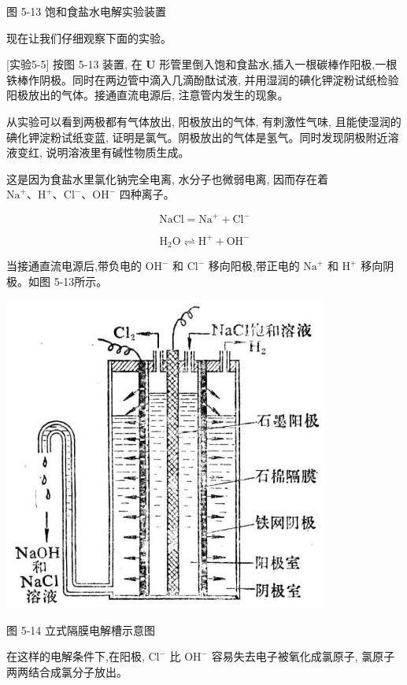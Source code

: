 \documentclass[10pt]{article}
\begin{document}
图 5-13 饱和食盐水电解实验装置

现在让我们仔细观察下面的实验。

[实验5-5] 按图 5-13 装置, 在 \(\mathbf{U}\) 形管里倒入饱和食盐水,插入一根碳棒作阳极,一根铁棒作阴极。同时在两边管中滴入几滴酚酞试液, 并用湿润的碘化钾淀粉试纸检验阳极放出的气体。接通直流电源后, 注意管内发生的现象。

从实验可以看到两极都有气体放出, 阳极放出的气体, 有刺激性气味, 且能使湿润的碘化钾淀粉试纸变蓝, 证明是氯气。阴极放出的气体是氢气。同时发现阴极附近溶液变红, 说明溶液里有碱性物质生成。

这是因为食盐水里氯化钠完全电离, 水分子也微弱电离, 因而存在着 \({\mathrm{{Na}}}^{ + }\text{、}{\mathrm{H}}^{ + }\text{、}{\mathrm{{Cl}}}^{ - }\text{、}{\mathrm{{OH}}}^{ - }\) 四种离子。

\[
\mathrm{{NaCl}} = {\mathrm{{Na}}}^{ + } + {\mathrm{{Cl}}}^{ - }
\]

\[
{\mathrm{H}}_{2}\mathrm{O} \rightleftharpoons {\mathrm{H}}^{ + } + {\mathrm{{OH}}}^{ - }
\]

当接通直流电源后,带负电的 \({\mathrm{{OH}}}^{ - }\) 和 \({\mathrm{{Cl}}}^{ - }\) 移向阳极,带正电的 \({\mathrm{{Na}}}^{ + }\) 和 \({\mathrm{H}}^{ + }\) 移向阴极。如图 5-13所示。

\begin{center}
\includegraphics[max width=0.8\textwidth]{images/01912d13-9986-7822-a012-3f3f7be99dcb_170_276891.jpg}
\end{center}

图 5-14 立式隔膜电解槽示意图

在这样的电解条件下,在阳极, \({\mathrm{{Cl}}}^{ - }\) 比 \({\mathrm{{OH}}}^{ - }\) 容易失去电子被氧化成氯原子, 氯原子两两结合成氯分子放出。
\end{document}
